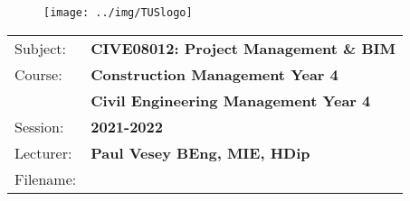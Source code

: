 \documentclass[a4paper, 10pt]{article}
\begin{document}
\lstset{language=HTML,
				basicstyle=\small,
				breaklines=true,
        numbers=left,
        numberstyle=\tiny,
        showstringspaces=false,
        aboveskip=-20pt,
        frame=leftline
        }
				

\begin{figure}
	\centering
	\texttt{[image: ../img/TUSlogo]}
\end{figure}


\begin{tabularx}{\textwidth}{ |l|X| }
	\hline
	
	Subject: & \textbf{CIVE08012: Project Management \& BIM}\\
	Course: & \textbf{Construction Management Year 4}\\
	        & \textbf{Civil Engineering Management Year 4}\\
	Session: & \textbf{2021-2022}\\
	Lecturer: & \textbf{Paul Vesey \footnotesize{BEng, MIE, HDip}}\\
	Filename: & \textbf{\currfilebase}\\
	\hline
\end{tabularx}



\vspace{0.25cm}	
\end{document}
